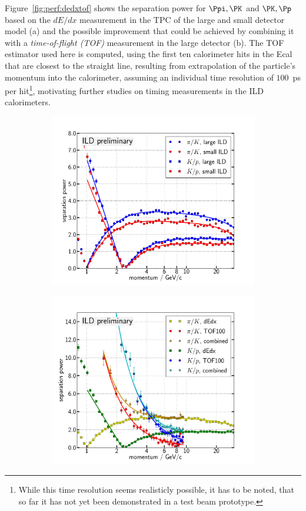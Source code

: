 Figure~\ref{fig:perf:dedxtof} shows the separation power
for $\Ppi,\PK$ and $\PK,\Pp$  based on the $dE/dx$ measurement in the TPC of the large and small detector model (a)
and the possible improvement that could be achieved by combining it with a  {\em time-of-flight (TOF)} measurement in the large detector (b).
The TOF estimator used here is computed, using the first ten calorimeter hits in the Ecal that are closest to the straight line,
resulting from extrapolation of the particle's momentum into the calorimeter, assuming an individual time resolution of $100$~ps
per hit\footnote{While this time resolution seems realisticly possible, it has to be noted, that so far it has not yet been demonstrated
  in a test beam prototype.}, motivating further studies on timing measurements in the ILD calorimeters.
%
% 
\begin{figure}[htbp]
\begin{subfigure}{0.49\hsize}
 \includegraphics[width=\hsize]{Performance/fig/dEdx_ILDls_separation_power.pdf}
 \caption{ \label{fig:perf:dedx_sep}}
 \end{subfigure}
\begin{subfigure}{0.49\hsize}
 \includegraphics[width=\hsize]{Performance/fig/Combined_dEdx_TOF100.pdf}

\end{subfigure}
\end{figure}

